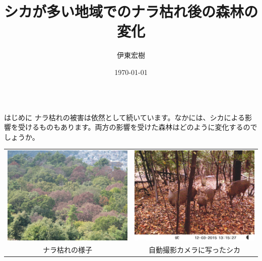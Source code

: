 \documentclass[unicode]{beamer}
\title{シカが多い地域でのナラ枯れ後の森林の変化}
\author{伊東宏樹}
\institute{森林総合研究所北海道支所}
\date{\today}
\begin{document}
\begin{frame}
\begin{columns}[t]
\begin{column}{.49\linewidth}

\begin{block}{はじめに}
ナラ枯れの被害は依然として続いています。なかには、シカによる影響を受けるものもあります。両方の影響を受けた森林はどのように変化するのでしょうか。

\vspace{2cm}
\centering
\begin{tabular}{cc}
\includegraphics[width=18cm]{photo-2.jpg} &
\includegraphics[width=18cm]{photo-3.jpg} \\
{\small ナラ枯れの様子} &
{\small 自動撮影カメラに写ったシカ}
\end{tabular}



\end{block}
\end{column}
\end{columns}
\end{frame}
\end{document}
